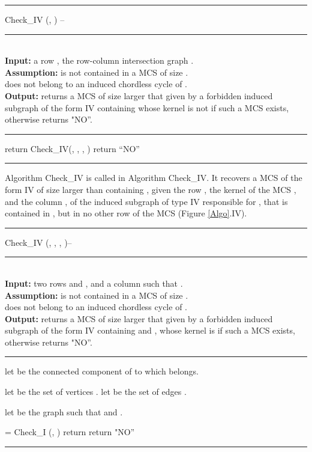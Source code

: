 \documentclass{article}
\begin{document}
\begin{algorithm}[htpb]                      
\rule{11.7cm}{0.01cm}
\caption{Check\_IV (, ) -- } 
\rule{11.7cm}{0.01cm}
\\
{\bf Input:} a row , the row-column intersection graph .\\
{\bf Assumption:}   is not contained in a MCS of size .\\
 does not belong to an induced chordless cycle of .\\
{\bf Output:} returns a MCS  of size larger that  given by a 
forbidden induced subgraph of the form IV containing  whose kernel is 
not  if such a MCS exists, otherwise returns  "NO''.
\rule{11.7cm}{0.01cm}
\begin{algorithmic}[1]                
\STATE return Check\_IV(, , , )
\ENDFOR
\ENDFOR
\STATE return ``NO''
\end{algorithmic}
\rule{11.7cm}{0.01cm}
\end{algorithm}

Algorithm \mbox{Check\_IV} is called in Algorithm \mbox{Check\_IV}. It 
recovers a  MCS  of the form IV of size larger 
than  containing , given the row , the  kernel  of 
the MCS , and the column , of the
induced subgraph of type IV responsible for , that is contained 
in , but in no other row of the MCS (Figure \ref{Algo}.IV).

 \begin{algorithm}[htpb]                      
 \rule{11.7cm}{0.01cm}
 \caption{Check\_IV (, , , )-- }
 \rule{11.7cm}{0.01cm}
 \\
 {\bf Input:} two rows  and , and a column  such that
   .\\
 {\bf Assumption:}   is not contained in a MCS of size .\\
  does not belong to an induced chordless cycle of .\\
 {\bf Output:} returns a MCS  of size larger that  given by a 
 forbidden induced subgraph of the form IV containing  and , whose 
 kernel is  if such a MCS exists, otherwise returns  "NO''.
 \rule{11.7cm}{0.01cm}
 \begin{algorithmic}[1]                
\STATE 
 \STATE let  be the connected component of  to which  belongs.


 \STATE let  be the set of vertices .
 \STATE let  be the set of edges .

 \STATE let  be the graph such that  and .

 \STATE  =  Check\_I (, )
 \STATE return 
 \ENDIF
 \STATE return "NO''
 \end{algorithmic}
 \rule{11.7cm}{0.01cm}
 \end{algorithm}
\end{document}

